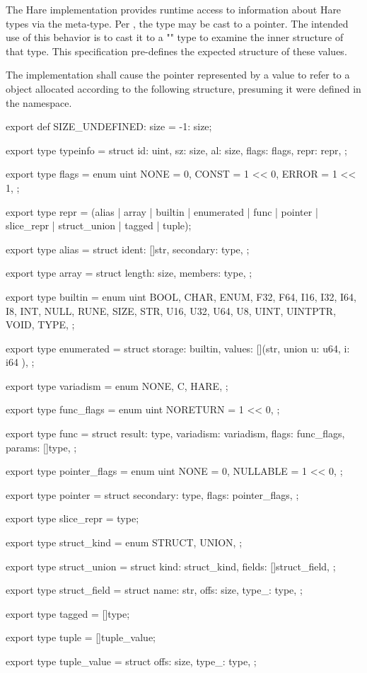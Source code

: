 
The Hare implementation provides runtime access to information about Hare types
via the  meta-type. Per ,
the  type may be cast to a pointer. The intended use of this
behavior is to cast it to a "" type to examine the inner
structure of that type. This specification pre-defines the expected structure
of these values.

\specsubitem
The implementation shall cause the pointer represented by a 
value to refer to a  object allocated according to the
following structure, presuming it were defined in the  namespace.

\begin{codesample}
export def SIZE_UNDEFINED: size = -1: size;

export type typeinfo = struct {
	id: uint,
	sz: size,
	al: size,
	flags: flags,
	repr: repr,
};

export type flags = enum uint {
	NONE = 0,
	CONST = 1 << 0,
	ERROR = 1 << 1,
};

export type repr = (alias | array | builtin
	| enumerated | func | pointer | slice_repr
	| struct_union | tagged | tuple);

export type alias = struct {
	ident: []str,
	secondary: type,
};

export type array = struct {
	length: size,
	members: type,
};

export type builtin = enum uint {
	BOOL, CHAR, ENUM, F32, F64, I16, I32, I64, I8, INT, NULL, RUNE, SIZE,
	STR, U16, U32, U64, U8, UINT, UINTPTR, VOID, TYPE,
};

export type enumerated = struct {
	storage: builtin,
	values: [](str, union { u: u64, i: i64 }),
};

export type variadism = enum {
	NONE,
	C,
	HARE,
};

export type func_flags = enum uint {
	NORETURN = 1 << 0,
};

export type func = struct {
	result: type,
	variadism: variadism,
	flags: func_flags,
	params: []type,
};

export type pointer_flags = enum uint {
	NONE = 0,
	NULLABLE = 1 << 0,
};

export type pointer = struct {
	secondary: type,
	flags: pointer_flags,
};

export type slice_repr = type;

export type struct_kind = enum {
	STRUCT,
	UNION,
};

export type struct_union = struct {
	kind: struct_kind,
	fields: []struct_field,
};

export type struct_field = struct {
	name: str,
	offs: size,
	type_: type,
};

export type tagged = []type;

export type tuple = []tuple_value;

export type tuple_value = struct {
	offs: size,
	type_: type,
};
\end{codesample}

